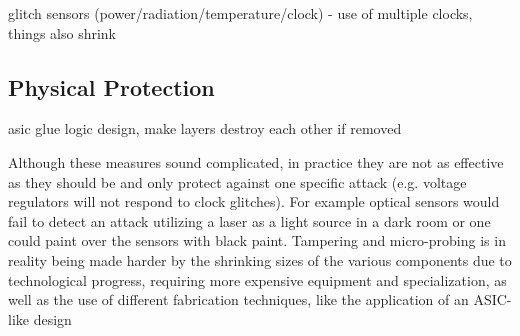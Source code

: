 glitch sensors (power/radiation/temperature/clock) - use of multiple clocks, 
things also shrink


\subsection{Physical Protection}
asic glue logic design, make layers destroy each other if removed\citep{anderson:cautionary_note}

Although these measures sound complicated, in practice they are not as effective as they should be and only protect against one specific attack (e.g. voltage regulators will not respond to clock glitches). For example optical sensors would fail to detect an attack utilizing a laser as a light source in a dark room\citep{hwre} or one could paint over the sensors with black paint. Tampering and micro-probing is in reality being made harder by the shrinking sizes of the various components due to technological progress, requiring more expensive equipment and specialization, as well as the use of different fabrication techniques, like the application of an ASIC-like design\citep{sergei:thesis}\citep{hwre}